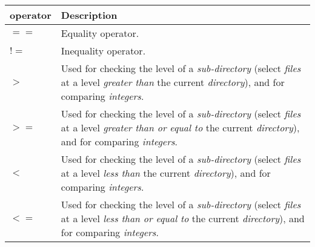 \documentclass[11pt]{article}
\begin{document}
\begin{table}[ht]
  \centering
  \vspace{0.5em}
  \begin{tabular}{|m{8em}|b{34em}|}
  \hline

  \textbf{operator}
  &
  \vspace{0.7em}
  \textbf{Description} \\ [0.7em]
  \hline

  $==$
  &
  \vspace{0.7em}
  Equality operator.
  \\[0.7em]
  \hline

  $!=$
  &
  \vspace{0.7em}
  Inequality operator.
  \\[0.7em]
  \hline

  \vspace{-0.9em}
  $>$
  &
  \vspace{0.7em}
  Used for checking the level of a \emph{sub-directory} (select \emph{files} at a level \emph{greater than} the current \emph{directory}), and for comparing \emph{integers}.
  \\[0.7em]
  \hline

  \vspace{-0.9em}
  $>=$
  &
  \vspace{0.7em}
  Used for checking the level of a \emph{sub-directory} (select \emph{files} at a level \emph{greater than or equal to} the current \emph{directory}), and for comparing \emph{integers}.
  \\[0.7em]
  \hline

  \vspace{-0.9em}
  $<$
  &
  \vspace{0.7em}
  Used for checking the level of a \emph{sub-directory} (select \emph{files} at a level \emph{less than} the current \emph{directory}), and for comparing \emph{integers}.
  \\[0.7em]
  \hline

  \vspace{-0.9em}
  $<=$
  &
  \vspace{0.7em}
  Used for checking the level of a \emph{sub-directory} (select \emph{files} at a level \emph{less than or equal to} the current \emph{directory}), and for comparing \emph{integers}.
  \\[0.7em]
  \hline

  \end{tabular}
\end{table}
\end{document}
